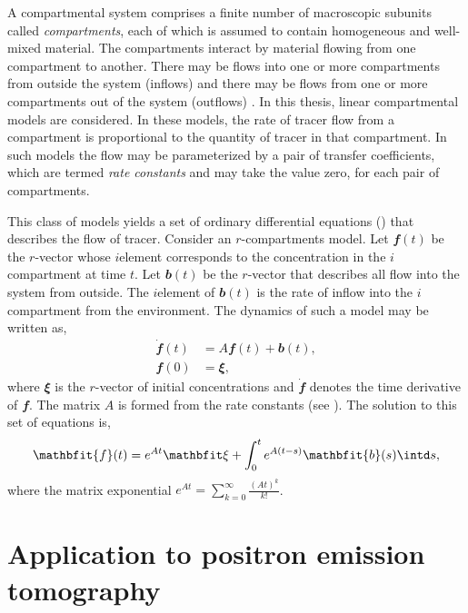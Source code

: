 A compartmental system comprises a finite number of macroscopic subunits called \emph{compartments}, each of which is assumed to contain homogeneous and well-mixed material. The compartments interact by material flowing from one compartment to another. There may be flows into one or more compartments from outside the system (inflows) and there may be flows from one or more compartments out of the system (outflows) \cite{Jacquez:1996gc}. In this thesis, linear compartmental models are considered. In these models, the rate of tracer flow from a compartment is proportional to the quantity of tracer in that compartment. In such models the flow may be parameterized by a pair of transfer coefficients, which are termed \emph{rate constants} and may take the value zero, for each pair of compartments.

This class of models yields a set of ordinary differential equations (\ode) that describes the flow of tracer. Consider an $r$-compartments model. Let $\mathbfit{f}(t)$ be the $r$-vector whose $i$\xth element corresponds to the concentration in the $i$\xth compartment at time $t$. Let $\mathbfit{b}(t)$ be the $r$-vector that describes all flow into the system from outside. The $i$\xth element of $\mathbfit{b}(t)$ is the rate of inflow into the $i$\xth compartment from the environment. The dynamics of such a model may be written as,
\begin{align*}
  \dot{\mathbfit{f}}(t) &= A\mathbfit{f}(t) + \mathbfit{b}(t), \\
  \mathbfit{f}(0) &= \mathbfit\xi,
\end{align*}
where $\mathbfit\xi$ is the $r$-vector of initial concentrations and $\dot{\mathbfit{f}}$ denotes the time derivative of $\mathbfit{f}$. The matrix $A$ is formed from the rate constants (see \cite{Gunn:2001cx}). The solution \cite[][sec.~8.3.1]{Seber:2003vx} to this set of equations is,
\begin{equation*}
  \mathbfit{f}(t) = e^{A t}\mathbfit\xi +
  \int_0^t e^{A(t-s)}\mathbfit{b}(s)\intd s,
\end{equation*}
where the matrix exponential $e^{A t} = \sum_{k=0}^{\infty} \frac{(At)^k}{k!}$.

\section{Application to positron emission tomography}
\label{sec:Application to positron emission tomography}

